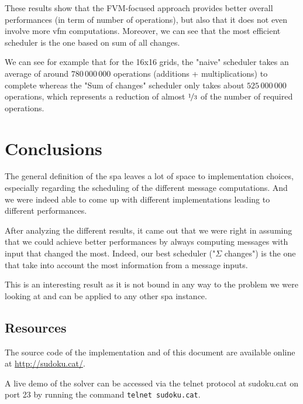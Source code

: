 \documentclass[a4paper,11pt]{report}
\begin{document}
These results show that the FVM-focused approach provides better overall performances (in term of number of operations), but also that it does not even involve more \ac{vfm} computations. Moreover, we can see that the most efficient scheduler is the one based on sum of all changes.

We can see for example that for the 16x16 grids, the "naive" scheduler takes an average of around $780\,000\,000$ operations (additions + multiplications) to complete whereas the "Sum of changes" scheduler only takes about $525\,000\,000$ operations, which represents a reduction of almost $\nicefrac{1}{3}$ of the number of required operations.

\chapter{Conclusions}

The general definition of the \ac{spa} leaves a lot of space to implementation choices, especially regarding the scheduling of the different message computations. And we were indeed able to come up with different implementations leading to different performances.

After analyzing the different results, it came out that we were right in assuming that we could achieve better performances by always computing messages with input that changed the most. Indeed, our best scheduler ("$\Sigma$ changes") is the one that take into account the most information from a message inputs.

This is an interesting result as it is not bound in any way to the problem we were looking at and can be applied to any other \ac{spa} instance.

\section*{Resources}

The source code of the implementation and of this document are available online at \url{http://sudoku.cat/}.

A live demo of the solver can be accessed via the telnet protocol at sudoku.cat on port 23 by running the command \texttt{telnet sudoku.cat}.

\nocite{*}


\end{document}
